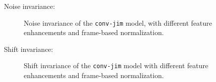 Noise invariance:
\begin{figure}[!ht]
  \centering
  \caption{Noise invariance of the \texttt{conv-jim} model, with different feature enhancements and frame-based normalization.}
  \label{fig:exp_fs_mfcc_tb_noise_conv-jim}
\end{figure}
\FloatBarrier
\noindent

Shift invariance:
\begin{figure}[!ht]
  \centering
  \caption{Shift invariance of the \texttt{conv-jim} model with different feature enhancements and frame-based normalization.}
  \label{fig:exp_fs_mfcc_tb_shift_conv-jim}
\end{figure}
\FloatBarrier
\noindent
